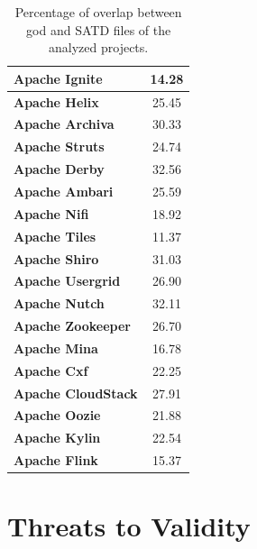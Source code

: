 \begin{table}[htbp]
\begin{tabular}{l|c}
			\textbf{Apache Ignite}     &    14.28     \\ \hline
			\textbf{Apache Helix}      &    25.45     \\ \hline
			\textbf{Apache Archiva}    &    30.33     \\ \hline
			\textbf{Apache Struts}     &    24.74     \\ \hline
			\textbf{Apache Derby}      &    32.56     \\ \hline
			\textbf{Apache Ambari}     &    25.59     \\ \hline
			\textbf{Apache Nifi}       &    18.92     \\ \hline
			\textbf{Apache Tiles}      &    11.37     \\ \hline
			\textbf{Apache Shiro}      &    31.03     \\ \hline
			\textbf{Apache Usergrid}   &    26.90     \\ \hline
			\textbf{Apache Nutch}      &    32.11     \\ \hline
			\textbf{Apache Zookeeper}  &    26.70     \\ \hline
			\textbf{Apache Mina}       &    16.78     \\ \hline
			\textbf{Apache Cxf}        &    22.25     \\ \hline
			\textbf{Apache CloudStack} &    27.91     \\ \hline
			\textbf{Apache Oozie}      &    21.88     \\ \hline
			\textbf{Apache Kylin}      &    22.54     \\ \hline
			\textbf{Apache Flink}      &    15.37     \\ \hline
\end{tabular}
	\caption{Percentage of overlap between god and SATD files of the analyzed projects.}
\end{table}



\section{Threats to Validity}
\label{chap4:sec:threats_to_validity}



